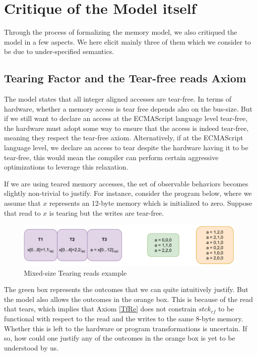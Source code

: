\section{Critique of the Model itself}

    Through the process of formalizing the memory model, we also critiqued the model in a few aspects. 
    We here elicit mainly three of them which we consider to be due to under-specified semantics.

    \subsection{Tearing Factor and the Tear-free reads Axiom}

        The model states that all integer aligned accesses are tear-free.  
        In terms of hardware, whether a memory access is tear free depends also on the bus-size.
        But if we still want to declare an access at the ECMAScript language level tear-free, the hardware must adopt some way to ensure that the access is indeed tear-free, meaning they respect the tear-free axiom.
        Alternatively, if at the ECMAScript language level, we declare an access to tear despite the hardware having it to be tear-free, this would mean the compiler can perform certain aggressive optimizations to leverage this relaxation. 

        If we are using teared memory accesses, the set of observable behaviors becomes slightly non-trivial to justify.
        For instance, consider the program below, where we assume that $x$ represents an 12-byte memory which is initialized to zero. 
        Suppose that read to $x$ is tearing but the writes are tear-free.
        
        \begin{figure}[H]
            \centering
            \includegraphics[scale=0.7]{7.ConclusionFutureWork/TearingExample.pdf}
            \caption{Mixed-size Tearing reads example}
        \end{figure}

        The green box represents the outcomes that we can quite intuitively justify.
        But the model also allows the outcomes in the orange box. 
        This is because of the read that tears, which implies that Axiom \ref{TfRe} does not constrain $stck{_{rf}}$ to be functional with respect to the read and the writes to the same 8-byte memory. 
        Whether this is left to the hardware or program transformations is uncertain.
        If so, how could one justify any of the outcomes in the orange box is yet to be understood by us. 

